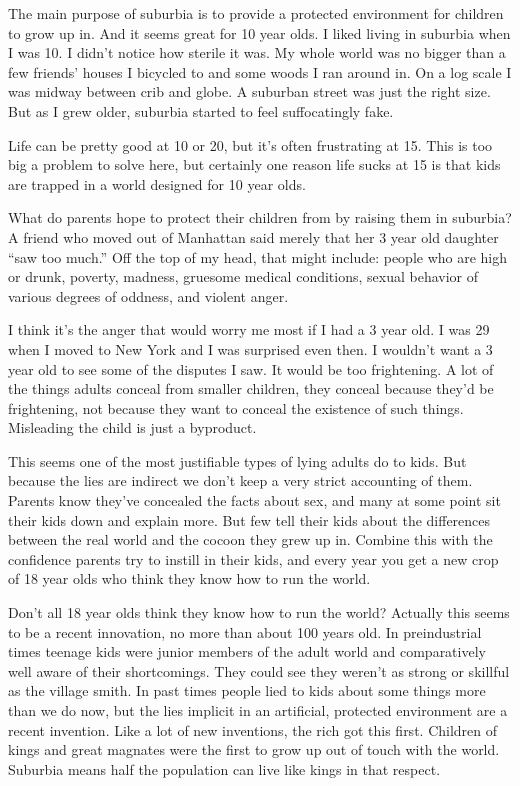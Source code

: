 The main purpose of suburbia is to provide a protected environment for
children to grow up in. And it seems great for 10 year olds. I liked
living in suburbia when I was 10. I didn't notice how sterile it was. My
whole world was no bigger than a few friends' houses I bicycled to and
some woods I ran around in. On a log scale I was midway between crib and
globe. A suburban street was just the right size. But as I grew older,
suburbia started to feel suffocatingly fake.

Life can be pretty good at 10 or 20, but it's often frustrating at 15.
This is too big a problem to solve here, but certainly one reason life
sucks at 15 is that kids are trapped in a world designed for 10 year
olds.

What do parents hope to protect their children from by raising them in
suburbia? A friend who moved out of Manhattan said merely that her 3
year old daughter ``saw too much.'' Off the top of my head, that might
include: people who are high or drunk, poverty, madness, gruesome
medical conditions, sexual behavior of various degrees of oddness, and
violent anger.

I think it's the anger that would worry me most if I had a 3 year old. I
was 29 when I moved to New York and I was surprised even then. I
wouldn't want a 3 year old to see some of the disputes I saw. It would
be too frightening. A lot of the things adults conceal from smaller
children, they conceal because they'd be frightening, not because they
want to conceal the existence of such things. Misleading the child is
just a byproduct.

This seems one of the most justifiable types of lying adults do to kids.
But because the lies are indirect we don't keep a very strict accounting
of them. Parents know they've concealed the facts about sex, and many at
some point sit their kids down and explain more. But few tell their kids
about the differences between the real world and the cocoon they grew up
in. Combine this with the confidence parents try to instill in their
kids, and every year you get a new crop of 18 year olds who think they
know how to run the world.

Don't all 18 year olds think they know how to run the world? Actually
this seems to be a recent innovation, no more than about 100 years old.
In preindustrial times teenage kids were junior members of the adult
world and comparatively well aware of their shortcomings. They could see
they weren't as strong or skillful as the village smith. In past times
people lied to kids about some things more than we do now, but the lies
implicit in an artificial, protected environment are a recent invention.
Like a lot of new inventions, the rich got this first. Children of kings
and great magnates were the first to grow up out of touch with the
world. Suburbia means half the population can live like kings in that
respect.

